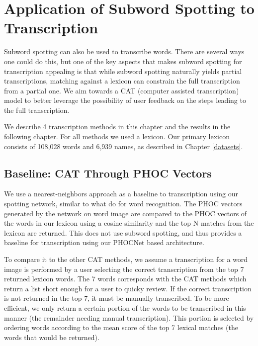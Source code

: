 \documentclass[ms,electronic,twosidetoc,letterpaper,chaptercenter,parttop,lof,lot]{byumsphd}
\begin{document}
\chapter{Application of Subword Spotting to Transcription}\label{transcription}

Subword spotting can also be used to transcribe words. There are several ways one could do this, but one of the key aspects that makes subword spotting for transcription appealing is that while subword spotting naturally yields partial transcriptions, matching against a lexicon can constrain the full transcription from a partial one. We aim towards a CAT (computer assisted transcription) model to better leverage the possibility of user feedback on the steps leading to the full transcription.

We describe 4 transcription methods in this chapter and the results in the following chapter.
For all methods we used a lexicon. Our primary lexicon consists of 108,028 words and 6,939 names, as described in Chapter \ref{datasets}.

\section{Baseline: CAT Through PHOC Vectors}
We use a nearest-neighbors approach as a baseline to transcription using our spotting network, similar to what \cite{krishnan2016} do for word recognition. The PHOC vectors generated by the network on word image are compared to the PHOC vectors of the  words in our lexicon using a cosine similarity and the top N matches from the lexicon are returned. This does not use subword spotting, and thus provides a baseline for transcription using our PHOCNet based architecture.

To compare it to the other CAT methods, we assume a transcription for a word image is performed by a user selecting the correct transcription from the top 7 returned lexicon words. The 7 words corresponds with the CAT methods which return a list short enough for a user to quicky review. If the correct transcription is not returned in the top 7, it must be manually transcribed.
To be more efficient, we only return a certain portion of the words to be transcribed in this manner (the remainder needing manual transcription). This portion is selected by ordering words according to the mean score of the top 7 lexical matches (the words that would be returned).
\end{document}
